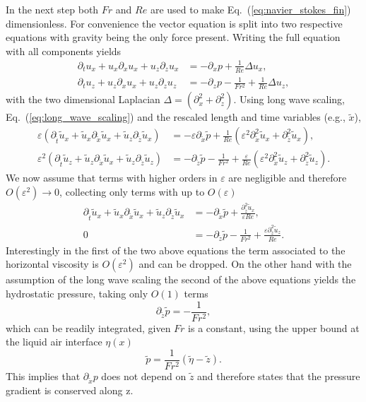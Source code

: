 In the next step both $Fr$ and $Re$ are used to make Eq.~(\ref{eq:navier_stokes_fin}) dimensionless.
For convenience the vector equation is split into two respective equations with gravity being the only force present.
Writing the full equation with all components yields
\begin{align}\label{eq:2d_RNS}
    \partial_t u_x + u_x\partial_x u_x + u_z\partial_z u_x &= -\partial_x p + \frac{1}{Re}\Delta u_x ,\\
    \partial_t u_z + u_z\partial_x u_x + u_z\partial_z u_z &= -\partial_z p - \frac{1}{Fr^2} + \frac{1}{Re}\Delta u_z ,
\end{align}
with the two dimensional Laplacian $\Delta = (\partial_x^2 + \partial_z^2)$.
Using long wave scaling, Eq.~(\ref{eq:long_wave_scaling}) and the rescaled length and time variables (e.g., $\tilde{x}$),
\begin{align}\label{eq:2d_RNS_eps}
    \varepsilon(\partial_{\tilde{t}} \tilde{u}_x + \tilde{u}_x \partial_{\tilde{x}} \tilde{u}_x + \tilde{u}_z \partial_{\tilde{z}} \tilde{u}_x ) &= -\varepsilon\partial_{\tilde{x}} \tilde{p} + \frac{1}{Re}(\varepsilon^2 \partial_{\tilde{x}}^2 \tilde{u}_x + \partial_{\tilde{z}}^2 \tilde{u}_x ) ,\\
    \varepsilon^2(\partial_{\tilde{t}} \tilde{u}_z + \tilde{u}_z\partial_{\tilde{x}} \tilde{u}_x + \tilde{u}_z\partial_{\tilde{z}} \tilde{u}_z) &= -\partial_{\tilde{z}}\tilde{p} - \frac{1}{Fr^2} + \frac{\varepsilon}{Re}(\varepsilon^2 \partial_{\tilde{x}}^2 \tilde{u}_z + \partial_{\tilde{z}}^2 \tilde{u}_z ) .
\end{align}
We now assume that terms with higher orders in $\varepsilon$ are negligible and therefore $O(\varepsilon^2) \rightarrow 0$, collecting only terms with up to $O(\varepsilon)$
\begin{align}\label{eq:2d_RNS_linear}
    \partial_{\tilde{t}} \tilde{u}_x + \tilde{u}_x\partial_{\tilde{x}} \tilde{u}_x + \tilde{u}_z\partial_{\tilde{z}} \tilde{u}_x &= -\partial_{\tilde{x}} \tilde{p} + \frac{\partial_{\tilde{z}}^2\tilde{u}_x}{\varepsilon Re}, \\
    0 &= -\partial_{\tilde{z}}\tilde{p} - \frac{1}{Fr^2} + \frac{\varepsilon\partial_{\tilde{z}}^2 \tilde{u}_z}{Re} .
\end{align}
Interestingly in the first of the two above equations the term associated to the horizontal viscosity is $O(\varepsilon^2)$ and can be dropped.
On the other hand with the assumption of the long wave scaling the second of the above equations yields the hydrostatic pressure, taking only $O(1)$ terms
\begin{equation}\label{eq:hydro_static}
    \partial_{\tilde{z}}\tilde{p} = -\frac{1}{Fr^2},
\end{equation}
which can be readily integrated, given $Fr$ is a constant, using the upper bound at the liquid air interface $\eta(x)$ 
\begin{equation}\label{eq:hydro_static_int}
    \tilde{p} = \frac{1}{Fr^2}(\tilde{\eta} - \tilde{z}).   
\end{equation}
This implies that $\partial_{\tilde{x}}p$ does not depend on $\tilde{z}$ and therefore states that the pressure gradient is conserved along z.

